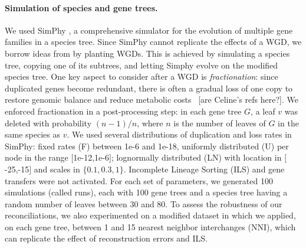 \documentclass[10pt]{article}
\newcommand{\ml}[1]{\begingroup\color{blue}#1\endgroup}
\begin{document}
\paragraph{Simulation of species and gene trees.}  We used SimPhy \cite{mallo2016simphy}, a comprehensive simulator for the evolution of multiple gene families in a species tree. 
Since SimPhy cannot replicate the effects of a WGD, we borrow ideas from \cite{gorecki2024unifying} by planting WGDs.  This is achieved by simulating a species tree, copying one of its subtrees, and letting Simphy evolve on the modified species tree.
One key aspect to consider after a WGD is \emph{fractionation}: since duplicated genes become redundant, there is often a gradual loss of one copy to restore genomic balance and reduce metabolic costs~\cite{lynch2000evolutionary, birchler2007gene, rabier2014detecting} \ml{[are Celine's refs here?]}. 
We enforced fractionation in a post-processing step: in each gene tree $G$, a leaf $v$ was deleted with probability $(n - 1)/n$, where $n$ is the number of leaves of $G$ in the same species as $v$.
We used several distributions of duplication and loss rates in SimPhy: fixed rates (F) between 1e-6 and 1e-18, uniformly distributed (U) per node in the range $[$1e-12,1e-6$]$; lognormally distributed (LN) with location in $[$-25,-15$]$ and scales in $\{0.1,0.3,1\}$.
Incomplete Lineage Sorting (ILS) and gene transfers were not activated.
For each set of parameters, we generated 100 simulations (called runs), each with 100 gene trees and a species tree having a random number of leaves between 30 and 80.
To assess the robustness of our reconciliations, we also experimented on a modified dataset in which we applied, on each gene tree, between 1 and 15 nearest neighbor interchanges (NNI), which can replicate the effect of reconstruction errors and ILS.
\end{document}

